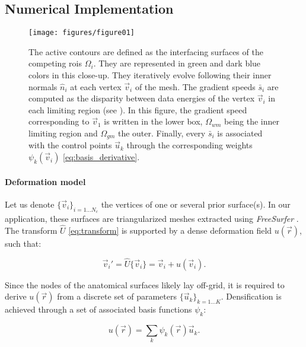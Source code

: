 \subsection*{Numerical Implementation}
\label{sec:numerical_implementation}

\begin{figure}
	\texttt{[image: figures/figure01]}
	\caption{The active contours are defined as the interfacing surfaces of the competing
	  \glspl{roi} $\Omega_i$.
	They are represented in green and dark blue colors in this close-up.
	They iteratively evolve following their inner normals $\hat{n}_i$ at each vertex
	  $\vec{v}_i$ of the mesh.
	The gradient speeds $\bar{s}_i$ are computed as the disparity between data energies of
	  the vertex $\vec{v}_i$ in each limiting region (see ).
	In this figure, the gradient speed corresponding to $\vec{v}_1$ is written in the lower
	  box, $\Omega_{wm}$ being the inner limiting region and $\Omega_{gm}$ the outer.
	Finally, every $\bar{s}_i$ is associated with the control points $\vec{u}_k$ through
	  the corresponding weights $\psi_k(\vec{v}_i)$ \eqref{eq:basis_derivative}.
	}\label{fig:method}
\end{figure}

\paragraph*{Deformation model}\label{sec:deformation_model}
Let us denote $\{\vec{v}_i\}_{i=1 \ldots N_c}$ the vertices of one or several prior
  surface(s).
In our application, these surfaces are triangularized meshes extracted using \emph{FreeSurfer}
  \citep{fischl_freesurfer_2012}.
The transform $\hat{U}$ \eqref{eq:transform} is supported by a dense deformation field
  $u(\vec{r})$, such that:

  \begin{equation}
  \vec{v}_i' = \hat{U}\{\vec{v}_i\} = \vec{v}_i + u(\vec{v}_i).
  \label{eq:nodes_tfm}
  \end{equation}

Since the nodes of the anatomical surfaces likely lay off-grid, it is required to
  derive $u(\vec{r})$ from a discrete set of parameters $\{\vec{u}_k\}_{k=1 \ldots K}$.
Densification is achieved through a set of associated basis functions $\psi_k$:

  \begin{equation}
  u(\vec{r}) = \sum_k \psi_k(\vec{r}) \vec{u}_k.
  \label{eq:intp_kernel}
  \end{equation}

